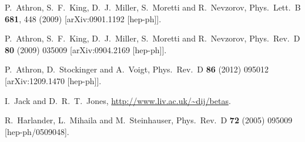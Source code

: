 \documentclass[final,3p,11pt,pdflatex]{elsarticle}
\newcommand{\ptitle}[1]{\emph{#1}}
\renewcommand{\ptitle}[1]{}
\begin{document}
\begin{thebibliography}{100}
  P.~Athron, S.~F.~King, D.~J.~Miller, S.~Moretti and R.~Nevzorov,
  Phys.\ Lett.\ B {\bf 681}, 448 (2009)
  [arXiv:0901.1192 [hep-ph]].


  P.~Athron, S.~F.~King, D.~J.~Miller, S.~Moretti and R.~Nevzorov,
  Phys.\ Rev.\ D {\bf 80} (2009) 035009
  [arXiv:0904.2169 [hep-ph]].



  P.~Athron, D.~Stockinger and A.~Voigt,
  Phys.\ Rev.\ D {\bf 86} (2012) 095012
  [arXiv:1209.1470 [hep-ph]].


  I.~Jack and D.~R.~T.~Jones, \ptitle{
    3-loop MSSM beta functions,}
  \url{http://www.liv.ac.uk/~dij/betas}.

  R.~Harlander, L.~Mihaila and M.~Steinhauser,
  Phys.\ Rev.\ D {\bf 72} (2005) 095009
  [hep-ph/0509048].

\end{thebibliography}
\end{document}
